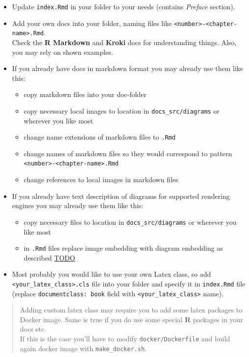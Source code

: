 \documentclass[
  12pt,
  a4paper,
  12pt,
  oneside,
  openany]{book}
\providecommand{\tightlist}{%
  \setlength{\itemsep}{0pt}\setlength{\parskip}{0pt}}
\begin{document}
\begin{itemize}
\item
  Update \texttt{index.Rmd} in your folder to your needs (contains \emph{Preface} section).
\item
  Add your own docs into your folder, naming files like \texttt{\textless{}number\textgreater{}-\textless{}chapter-name\textgreater{}.Rmd}.\\
  Check the \textbf{R Markdown} and \textbf{Kroki} docs for understanding things. Also, you may rely on shown examples.
\item
  If you already have docs in markdown format you may already use them like this:

  \begin{itemize}
  \tightlist
  \item
    copy markdown files into your doc-folder
  \item
    copy necessary local images to location in \texttt{docs\_src/diagrams} or wherever you like most
  \item
    change name extensions of markdown files to \texttt{.Rmd}
  \item
    change names of markdown files so they would correspond to pattern \texttt{\textless{}number\textgreater{}-\textless{}chapter-name\textgreater{}.Rmd}
  \item
    change references to local images in markdown files
  \end{itemize}
\item
  If you already have text description of diagrams for supported rendering engines you may already use them like this:

  \begin{itemize}
  \tightlist
  \item
    copy necessary files to location in \texttt{docs\_src/diagrams} or wherever you like most
  \item
    in \texttt{.Rmd} files replace image embedding with diagram embedding as described \url{TODO}
  \end{itemize}
\item
  Most probably you would like to use your own Latex class, so add \texttt{\textless{}your\_latex\_class\textgreater{}.cls} file into your folder and specify it in \texttt{index.Rmd} file (replace \texttt{documentclass:\ book} field with \texttt{\textless{}your\_latex\_class\textgreater{}} name).
\end{itemize}

\begin{quote}
Adding custom latex class may require you to add some latex packages to Docker image. Same is true if you do use some special \textbf{R} packages in your docs etc.\\
If this is the case you'll have to modify \texttt{docker/Dockerfile} and build again docker image with \texttt{make\_docker.sh}.
\end{quote}
\end{document}
